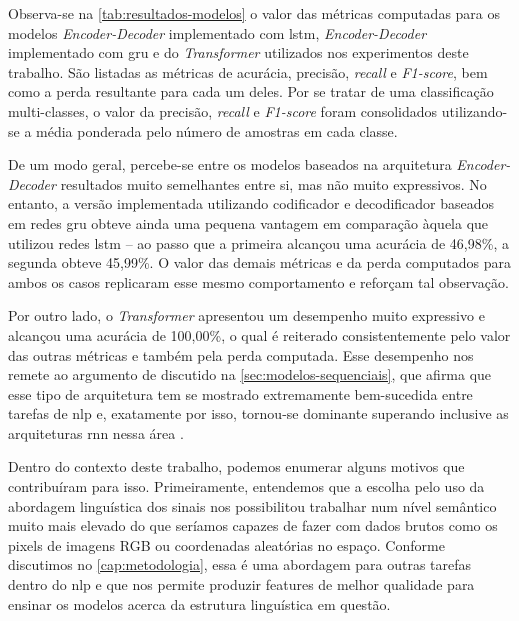 
Observa-se na \autoref{tab:resultados-modelos} o valor das métricas computadas para os modelos \textit{Encoder-Decoder} implementado com \acrshort{lstm}, \textit{Encoder-Decoder} implementado com \acrshort{gru} e do \textit{Transformer} utilizados nos experimentos deste trabalho.
São listadas as métricas de acurácia, precisão, \textit{recall} e \textit{F1-score}, bem como a perda resultante para cada um deles. Por se tratar de uma classificação multi-classes, o valor da precisão, \textit{recall} e \textit{F1-score} foram consolidados utilizando-se a média ponderada pelo número de amostras em cada classe.





De um modo geral, percebe-se entre os modelos baseados na arquitetura \textit{Encoder-Decoder} resultados muito semelhantes entre si, mas não muito expressivos. 
No entanto, a versão implementada utilizando codificador e decodificador baseados em redes \acrshort{gru} obteve ainda uma pequena vantagem em comparação àquela que utilizou redes \acrshort{lstm} -- ao passo que a primeira alcançou uma acurácia de 46,98\%, a segunda obteve 45,99\%. 
O valor das demais métricas e da perda computados para ambos os casos replicaram esse mesmo comportamento e reforçam tal observação.

Por outro lado, o \textit{Transformer} apresentou um desempenho muito expressivo e alcançou uma acurácia de 100,00\%, o qual é reiterado consistentemente pelo valor das outras métricas e também pela perda computada.
Esse desempenho nos remete ao argumento de  discutido na \autoref{sec:modelos-sequenciais}, que afirma que esse tipo de arquitetura tem se mostrado extremamente bem-sucedida entre tarefas de \acrfull{nlp} e, exatamente por isso, tornou-se dominante superando inclusive as arquiteturas \acrshort{rnn}  nessa área .

Dentro do contexto deste trabalho, podemos enumerar alguns motivos que contribuíram para isso.
Primeiramente, entendemos que a escolha pelo uso da abordagem linguística dos sinais nos possibilitou trabalhar num nível semântico muito mais elevado do que seríamos capazes de fazer com dados brutos como os pixels de imagens RGB ou coordenadas aleatórias no espaço. Conforme discutimos no \autoref{cap:metodologia}, essa é uma abordagem para outras tarefas dentro do \acrshort{nlp} e que nos permite produzir features de melhor qualidade para ensinar os modelos acerca da estrutura linguística em questão. 

